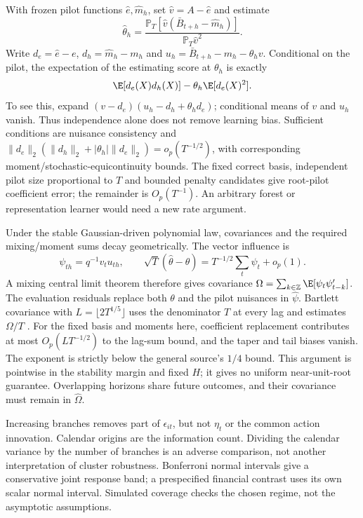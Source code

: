 With frozen pilot functions $\hat e,\hat m_h$, set
$\hat v=A-\hat e$ and estimate
\[
 \hat\theta_h=
 \frac{\mathbb P_T[\hat v(\bar B_{t+h}-\hat m_h)]}
      {\mathbb P_T\hat v^2}.
\]
Write $d_e=\hat e-e$, $d_h=\hat m_h-m_h$ and
$u_h=\bar B_{t+h}-m_h-\theta_hv$. Conditional on the pilot, the
expectation of the estimating score at $\theta_h$ is exactly
\begin{equation}
 \E[d_e(X)d_h(X)]-\theta_h\E[d_e(X)^2].
 \label{s6:pilot-remainder}
\end{equation}
To see this, expand
$(v-d_e)(u_h-d_h+\theta_hd_e)$; conditional means of $v$ and $u_h$
vanish. Thus independence alone does not remove learning bias. Sufficient
conditions are nuisance consistency and
$\|d_e\|_2(\|d_h\|_2+|\theta_h|\|d_e\|_2)=o_p(T^{-1/2})$,
with corresponding moment/stochastic-equicontinuity bounds. The fixed
correct basis, independent pilot size proportional to $T$ and bounded
penalty candidates give root-pilot coefficient error; the remainder is
$O_p(T^{-1})$. An arbitrary forest or representation learner would need
a new rate argument.

Under the stable Gaussian-driven polynomial law, covariances and the
required mixing/moment sums decay geometrically. The vector influence is
\[
 \psi_{th}=q^{-1}v_tu_{th},\qquad
 \sqrt T(\hat\theta-\theta)
 =T^{-1/2}\sum_t\psi_t+o_p(1).
\]
A mixing central limit theorem therefore gives covariance
$\Omega=\sum_{k\in\mathbb Z}\E[\psi_t\psi_{t-k}']$.
The evaluation residuals replace both $\theta$ and the pilot nuisances in
$\hat\psi$. Bartlett covariance with
$L=\lfloor2T^{1/5}\rfloor$ uses the denominator $T$ at every lag and
estimates $\Omega/T$ \citep{newey1986}. For the fixed basis and moments
here, coefficient replacement contributes at most
$O_p(LT^{-1/2})$ to the lag-sum bound, and the taper and tail biases vanish.
The exponent is strictly below the general source's $1/4$ bound.
This argument is pointwise in the stability margin and fixed $H$; it gives
no uniform near-unit-root guarantee. Overlapping horizons share future
outcomes, and their covariance must remain in $\hat\Omega$.

Increasing branches removes part of $\epsilon_{it}$, but not $\eta_t$ or
the common action innovation. Calendar origins are the information count.
Dividing the calendar variance by the number of branches is an adverse
comparison, not another interpretation of cluster robustness. Bonferroni
normal intervals give a conservative joint response band; a prespecified
financial contrast uses its own scalar normal interval. Simulated coverage
checks the chosen regime, not the asymptotic assumptions.


